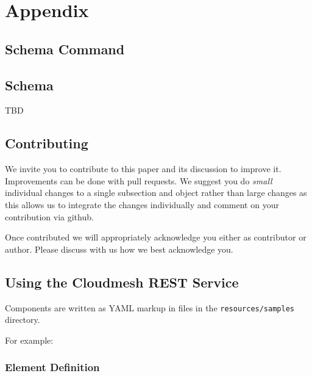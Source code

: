 \documentclass[10pt]{article}
\begin{document}
\appendix

\section{Appendix}

\subsection{Schema Command}




\subsection{Schema}\label{a:schema}

TBD


\subsection{Contributing}

We invite you to contribute to this paper and its discussion to
improve it. Improvements can be done with pull requests. We suggest
you do {\em small} individual changes to a single subsection and object
rather than large changes as this allows us to integrate the changes
individually and comment on your contribution via github.

Once contributed we will appropriately acknowledge you either as
contributor or author. Please discuss with us how we best acknowledge
you.

\subsection{Using the Cloudmesh REST Service} 

Components are written as YAML markup in files in the
\verb+resources/samples+ directory.

For example:


\subsubsection{Element Definition}
\end{document}
